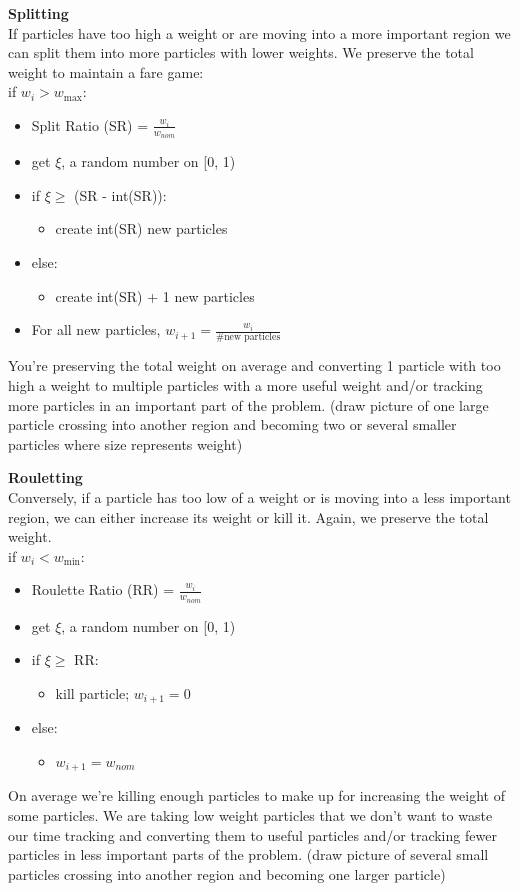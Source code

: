 \documentclass[12pt]{article}
\begin{document}
\textbf{Splitting}\\
If particles have too high a weight or are moving into a more important region we can split them into more particles with lower weights. We preserve the total weight to maintain a fare game:\\
\noindent\makebox[\linewidth]{\rule{\textwidth}{0.4pt}}
if $w_i > w_{\max}$:
\begin{itemize}
\item Split Ratio (SR) = $\frac{w_i}{w_{nom}}$
\item get $\xi$, a random number on [0, 1)
\item if $\xi \geq$ (SR - int(SR)):
  \begin{itemize}
  \item create int(SR) new particles
  \end{itemize}
\item else:
  \begin{itemize}
  \item create int(SR) + 1 new particles
  \end{itemize}
\item For all new particles, $w_{i+1} = \frac{w_i}{\# \text{new particles}}$
\end{itemize}
\noindent\makebox[\linewidth]{\rule{\textwidth}{0.4pt}}
%
You're preserving the total weight on average and converting 1 particle with too high a weight to multiple particles with a more useful weight and/or tracking more particles in an important part of the problem. (draw picture of one large particle crossing into another region and becoming two or several smaller particles where size represents weight)

\textbf{Rouletting}\\
Conversely, if a particle has too low of a weight or is moving into a less important region, we can either increase its weight or kill it. Again, we preserve the total weight.\\
\noindent\makebox[\linewidth]{\rule{\textwidth}{0.4pt}}
if $w_i < w_{\min}$:
\begin{itemize}
\item Roulette Ratio (RR) = $\frac{w_i}{w_{nom}}$
\item get $\xi$, a random number on [0, 1)
\item if $\xi \geq$ RR:
  \begin{itemize}
  \item kill particle; $w_{i+1} = 0$
  \end{itemize}
\item else:
  \begin{itemize}
  \item $w_{i+1} = w_{nom}$
  \end{itemize}
\end{itemize}
\noindent\makebox[\linewidth]{\rule{\textwidth}{0.4pt}}
%
On average we're killing enough particles to make up for increasing the weight of some particles. We are taking low weight particles that we don't want to waste our time tracking and converting them to useful particles and/or tracking fewer particles in less important parts of the problem. (draw picture of several small particles crossing into another region and becoming one larger particle)
\end{document}
